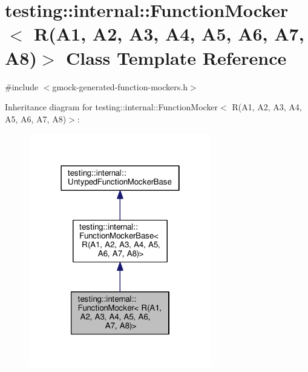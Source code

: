 \hypertarget{classtesting_1_1internal_1_1FunctionMocker_3_01R_07A1_00_01A2_00_01A3_00_01A4_00_01A5_00_01A6_00_01A7_00_01A8_08_4}{}\section{testing\+:\+:internal\+:\+:Function\+Mocker$<$ R(A1, A2, A3, A4, A5, A6, A7, A8)$>$ Class Template Reference}
\label{classtesting_1_1internal_1_1FunctionMocker_3_01R_07A1_00_01A2_00_01A3_00_01A4_00_01A5_00_01A6_00_01A7_00_01A8_08_4}


{\ttfamily \#include $<$gmock-\/generated-\/function-\/mockers.\+h$>$}



Inheritance diagram for testing\+:\+:internal\+:\+:Function\+Mocker$<$ R(A1, A2, A3, A4, A5, A6, A7, A8)$>$\+:
\nopagebreak
\begin{figure}[H]
\begin{center}
\leavevmode
\includegraphics[width=226pt]{classtesting_1_1internal_1_1FunctionMocker_3_01R_07A1_00_01A2_00_01A3_00_01A4_00_01A5_00_01A6_00dca28d29bc6b07fca9ae7971737b6bdc}
\end{center}
\end{figure}


